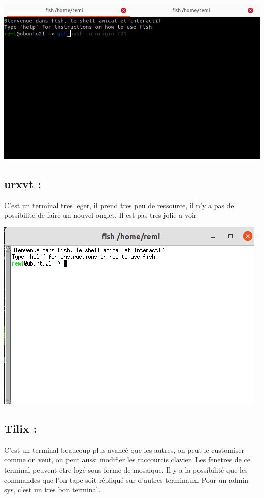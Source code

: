 \documentclass{article}
\begin{document}
 \begin{center}
        \includegraphics[scale=0.5]{Images/sakura.png}
 \end{center}
 
 \subsection*{\normalsize{urxvt :} } 
 C'est un terminal tres leger, il prend tres peu de ressource, il n'y a pas de possibilité de faire un nouvel onglet. Il est pas tres jolie a voir
 
 \begin{center}
        \includegraphics[scale=0.6]{Images/urxvt.png}
 \end{center}
 
 \newpage
  
 \subsection*{\normalsize{Tilix :} } 
C'est un terminal beaucoup plus avancé que les autres, on peut le customiser comme on veut, on peut aussi modifier les raccourcis clavier. Les fenetres de ce terminal peuvent etre logé sous forme de mosaique. Il y a la possibilité que les commandes que l'on tape soit répliqué sur d'autres terminaux. Pour un admin sys, c'est un tres bon terminal.
 
\end{document}
